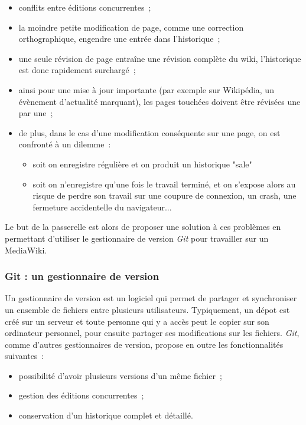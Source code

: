\documentclass[11pt]{article}
\begin{document}
\begin{itemize}
\item conflits entre éditions concurrentes~;
\item la moindre petite modification de page, comme une correction
  orthographique, engendre une entrée dans l'historique~;
\item une seule révision de page entraîne une révision complète du
  wiki, l'historique est donc rapidement surchargé~;
\item ainsi pour une mise à jour importante (par exemple sur Wikipédia, un
  évènement d'actualité marquant), les pages touchées doivent être
  révisées une par une~;
\item de plus, dans le cas d'une modification conséquente sur une
  page, on est confronté à un dilemme~:
  \begin{itemize}
  \item soit on enregistre régulière et on produit un historique "sale"
  \item soit on n'enregistre qu'une fois le travail terminé, et on
    s'expose alors au risque de perdre son travail sur une coupure de
    connexion, un crash, une fermeture accidentelle du navigateur...
  \end{itemize}
\end{itemize}

Le but de la passerelle est alors de proposer une solution à ces
problèmes en permettant d'utiliser le gestionnaire de version
\textit{Git} pour travailler sur un MediaWiki.

\subsubsection{Git : un gestionnaire de version}

Un gestionnaire de version est un logiciel qui permet de partager et
synchroniser un ensemble de fichiers entre plusieurs
utilisateurs. Typiquement, un dépot est créé sur un serveur et toute
personne qui y a accès peut le copier sur son ordinateur personnel,
pour ensuite partager ses modifications sur les
fichiers. \textit{Git}, comme d'autres gestionnaires de version,
propose en outre les fonctionnalités suivantes~:

\begin{itemize}
\item possibilité d'avoir plusieurs versions d'un même fichier~;
\item gestion des éditions concurrentes~;
\item conservation d'un historique complet et détaillé.
\end{itemize}
\end{document}
